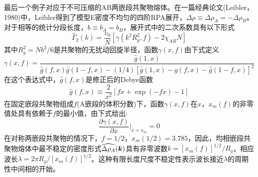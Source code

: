 最后一个例子对应于不可压缩的AB两嵌段共聚物熔体。在一篇经典论文(Leibler，1980)中，Leibler得到了模型E密度不均匀的四阶RPA展开，$\Delta\rho\equiv\Delta\rho_A=-\Delta\rho_B$。对于相等的统计分段长度，$b\equiv b_A=b_B$，展开式中的二次系数具有以下形式
\begin{equation}\label{5.38}
\hat{\Gamma}_2(k)=\frac{v_0}{N}\left[\gamma(k^2R_g^2,f)-2\chi_{AB}N\right]
\end{equation}
其中$R_g^2=Nb^2/6$是共聚物的无扰动回旋半径，函数$\gamma(x,f)$由下式定义
\begin{equation}
\gamma(x,f)=\frac{\hat{g}(1,x)}{\hat{g}(f,x)\hat{g}(1-f,x)-(1/4)[\hat{g}(1,x)-\hat{g}(f,x)-\hat{g}(1-f,x)]^2}
\end{equation}
在这个表达式中，$\hat{g}(f,x)$是修正后的Debye函数
\begin{equation}
\hat{g}(f,x)\equiv\frac{2}{x^2}[fx+\exp(-fx)-1]
\end{equation}
在固定嵌段共聚物组成$f$(A嵌段的体积分数)下，函数$\gamma(x,f)$在$x$，$x_m(f)$的非零值处具有依赖于$f$的最小值，由下式给出:
\begin{equation}
\frac{\partial\gamma(x,f)}{\partial x}\bigg|_{x=x_m}=0
\end{equation}
在对称两嵌段共聚物的情况下，$f=1/2$，$x_m(1/2)=3.785$，因此，均相嵌段共聚物熔体中最不稳定的密度形式$\widehat{\Delta\rho_A}(\bm{k})$具有非零波数$k=[x_m(f)]^{1/2}/R_g$，相应波长$\lambda=2\pi R_g/[x_m(f)]^{1/2}$。这种有限长度尺度不稳定性表示波长接近$\lambda$的周期性中间相的开始。

